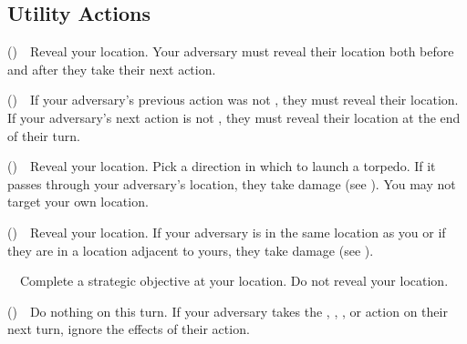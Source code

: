 \subsection*{Utility Actions}
\begin{description}[leftmargin=1em, labelwidth=0pt, labelsep=0pt]
\item[]\PPING{} (\LOUD{})\ \ Reveal your location. Your adversary must reveal their location both before and after they take their next action.
\item[] \LISTEN{} (\QUIET{})\ \ If your adversary's previous action was not \QUIET{}, they must reveal their location. If your adversary's next action is not \QUIET{}, they must reveal their location at the end of their turn.
\item[]\LAUNCH{} (\LOUD{})\ \ Reveal your location. Pick a direction in which to launch a torpedo. If it passes through your adversary's location, they take damage (see {}). You may not target your own location.
\item[]\SHOOT{} (\LOUD{})\ \  Reveal your location. If your adversary is in the same location as you or if they are in a location adjacent to yours, they take damage (see {}).
\item[]\ENCRYPT{}\ \ Complete a strategic objective at your location. Do not reveal your location.
\item[]\DIVE{} (\QUIET{})\ \  Do nothing on this turn. If your adversary takes the \LAUNCH{}, \SHOOT{}, \LISTEN{}, or \PPING{} action on their next turn, ignore the effects of their action.
\end{description}

